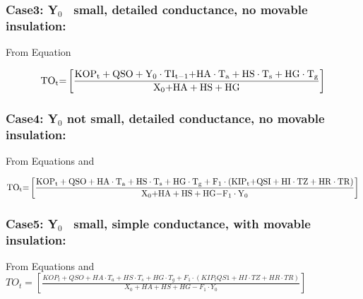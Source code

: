 \subsubsection{\texorpdfstring{Case3: Y\(_{0}\)~ small, detailed conductance, no movable insulation:}{Case3: Y\_\{0\}~ small, detailed conductance, no movable insulation:}}\label{case3-yux5f0-small-detailed-conductance-no-movable-insulation}

From Equation

\begin{equation}
{\rm{T}}{{\rm{O}}_{\rm{t}}}{\rm{ = }}\left[ {\frac{{{\rm{KO}}{{\rm{P}}_{\rm{t}}} + {\rm{QSO}} + {{\rm{Y}}_0}\cdot {\rm{T}}{{\rm{I}}_{{\rm{t - 1}}}}{\rm{ + HA}}\cdot {{\rm{T}}_{\rm{a}}} + {\rm{HS}}\cdot {{\rm{T}}_{\rm{s}}} + {\rm{HG}}\cdot {{\rm{T}}_{\rm{g}}}}}{{{{\rm{X}}_{\rm{0}}}{\rm{ + HA + HS + HG}}}}} \right]{\rm{  }}
\end{equation}

\subsubsection{\texorpdfstring{Case4: Y\(_{0}\) not small, detailed conductance, no movable insulation:}{Case4: Y\_\{0\} not small, detailed conductance, no movable insulation:}}\label{case4-yux5f0-not-small-detailed-conductance-no-movable-insulation}

From Equations and

\begin{equation}
{\rm{T}}{{\rm{O}}_{\rm{t}}}{\rm{ = }}\left[ {\frac{{{\rm{KO}}{{\rm{P}}_{\rm{t}}} + {\rm{QSO}} + {\rm{HA}}\cdot {{\rm{T}}_{\rm{a}}} + {\rm{HS}}\cdot {{\rm{T}}_{\rm{s}}} + {\rm{HG}}\cdot {{\rm{T}}_{\rm{g}}} + {{\rm{F}}_{\rm{1}}}\cdot \left( {{\rm{KI}}{{\rm{P}}_{\rm{t}}}{\rm{ + QSI + HI}}\cdot {\rm{TZ + HR}}\cdot {\rm{TR}}} \right)}}{{{{\rm{X}}_{\rm{0}}}{\rm{ + HA + HS + HG - }}{{\rm{F}}_1}\cdot {{\rm{Y}}_0}}}} \right]{\rm{  }}
\end{equation}

\subsubsection{\texorpdfstring{Case5: Y\(_{0}\)~ small, simple conductance, with movable insulation:}{Case5: Y\_\{0\}~ small, simple conductance, with movable insulation:}}\label{case5-yux5f0-small-simple-conductance-with-movable-insulation}

From Equations and \(TO_t = \left[ \frac{ KOP_t + QSO + HA \cdot T_a + HS \cdot T_s + HG \cdot T_g + F_1 \cdot \left( KIP_t QS1 + HI \cdot TZ + HR \cdot TR \right) } { X_0 + HA + HS + HG - F_1 \cdot Y_0 } \right]\)

